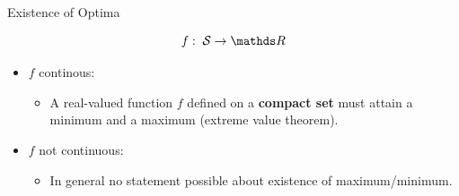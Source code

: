 \documentclass[11pt,compress,t,notes=noshow, xcolor=table]{beamer}
\begin{document}
  
  \begin{vbframe}{Existence of Optima}
  
  $$
  f: \; \mathcal{S} \to \R
  $$
  
  \begin{itemize}
  \item $f$ continous:
  \begin{itemize}
  \item A real-valued function $f$ defined on a \textbf{compact set} must attain a minimum and a maximum (extreme value theorem).
  \end{itemize}
  \item $f$ not continuous:
  \begin{itemize}
  \item In general no statement possible about existence of maximum/minimum.
  \end{itemize}
  \end{itemize}
  
  
  \end{vbframe}
    
\end{document}
